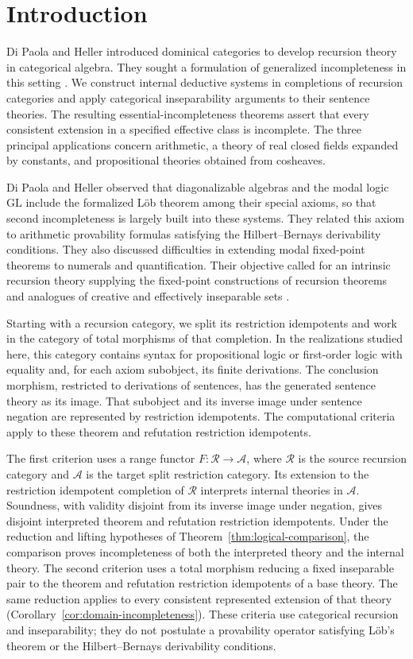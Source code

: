 \section{Introduction}

Di Paola and Heller introduced dominical categories to develop recursion
theory in categorical algebra. They sought a formulation of generalized
incompleteness in this setting \cite[pp.~594--595]{DPH}.
We construct internal deductive systems in completions of recursion
categories and apply categorical inseparability arguments to their
sentence theories. The resulting essential-incompleteness theorems
assert that every consistent extension in a specified effective class
is incomplete. The three principal applications concern arithmetic,
a theory of real closed fields expanded by constants, and propositional
theories obtained from cosheaves.

Di Paola and Heller observed that diagonalizable algebras and the modal
logic $\mathrm{GL}$ include the formalized L\"ob theorem among their special
axioms, so that second incompleteness is largely built into these systems.
They related this axiom to arithmetic provability formulas satisfying
the Hilbert--Bernays derivability conditions. They also discussed
difficulties in extending modal fixed-point theorems to numerals and
quantification. Their objective called for an intrinsic recursion theory
supplying the fixed-point constructions of recursion theorems and
analogues of creative and effectively inseparable sets
\cite[pp.~595--596]{DPH}.

Starting with a recursion category, we split its restriction idempotents
and work in the category of total morphisms of that completion.
In the realizations studied here, this category contains syntax for
propositional logic or first-order logic with equality and, for each
axiom subobject, its finite derivations. The conclusion morphism,
restricted to derivations of sentences, has the generated sentence
theory as its image. That subobject and its
inverse image under sentence negation are represented by restriction
idempotents. The computational criteria apply to these theorem and
refutation restriction idempotents.

The first criterion uses a range functor
$F:\mathscr R\to\mathcal A$, where $\mathscr R$ is the source
recursion category and $\mathcal A$ is the target split restriction
category. Its extension to the restriction idempotent completion of
$\mathscr R$ interprets internal theories in $\mathcal A$.
Soundness, with validity disjoint from its inverse image under negation,
gives disjoint interpreted theorem and refutation restriction idempotents.
Under the reduction and lifting hypotheses of
Theorem~\ref{thm:logical-comparison}, the comparison proves incompleteness
of both the interpreted theory and the internal theory.
The second criterion uses a total morphism reducing a fixed inseparable
pair to the theorem and refutation restriction idempotents of a base
theory. The same reduction applies to every consistent represented
extension of that theory
(Corollary~\ref{cor:domain-incompleteness}).
These criteria use categorical recursion and inseparability; they do not
postulate a provability operator satisfying L\"ob's theorem or the
Hilbert--Bernays derivability conditions.


